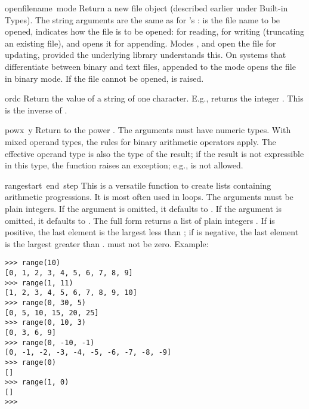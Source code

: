 \begin{funcdesc}{open}{filename\, mode}
  Return a new file object (described earlier under Built-in Types).
  The string arguments are the same as for 's
  :  is the file name to be opened,
   indicates how the file is to be opened:  for
  reading,  for writing (truncating an existing file), and
   opens it for appending.  Modes ,  and
   open the file for updating, provided the underlying
   library understands this.  On systems that differentiate
  between binary and text files,  appended to the mode opens
  the file in binary mode.  If the file cannot be opened, 
  is raised.
\end{funcdesc}

\begin{funcdesc}{ord}{c}
  Return the \ASCII{} value of a string of one character.  E.g.,
   returns the integer .  This is the inverse of
  .
\end{funcdesc}

\begin{funcdesc}{pow}{x\, y}
  Return  to the power .  The arguments must have
  numeric types.  With mixed operand types, the rules for binary
  arithmetic operators apply.  The effective operand type is also the
  type of the result; if the result is not expressible in this type, the
  function raises an exception; e.g.,  is not allowed.
\end{funcdesc}

\begin{funcdesc}{range}{start\, end\, step}
  This is a versatile function to create lists containing arithmetic
  progressions.  It is most often used in  loops.  The
  arguments must be plain integers.  If the  argument is
  omitted, it defaults to .  If the  argument is
  omitted, it defaults to .  The full form returns a list of
  plain integers .  If  is positive,
  the last element is the largest  less than ; if  is negative, the last
  element is the largest 
  greater than .   must not be zero.  Example:

\bcode\begin{verbatim}
>>> range(10)
[0, 1, 2, 3, 4, 5, 6, 7, 8, 9]
>>> range(1, 11)
[1, 2, 3, 4, 5, 6, 7, 8, 9, 10]
>>> range(0, 30, 5)
[0, 5, 10, 15, 20, 25]
>>> range(0, 10, 3)
[0, 3, 6, 9]
>>> range(0, -10, -1)
[0, -1, -2, -3, -4, -5, -6, -7, -8, -9]
>>> range(0)
[]
>>> range(1, 0)
[]
>>> 
\end{verbatim}\ecode
\end{funcdesc}

